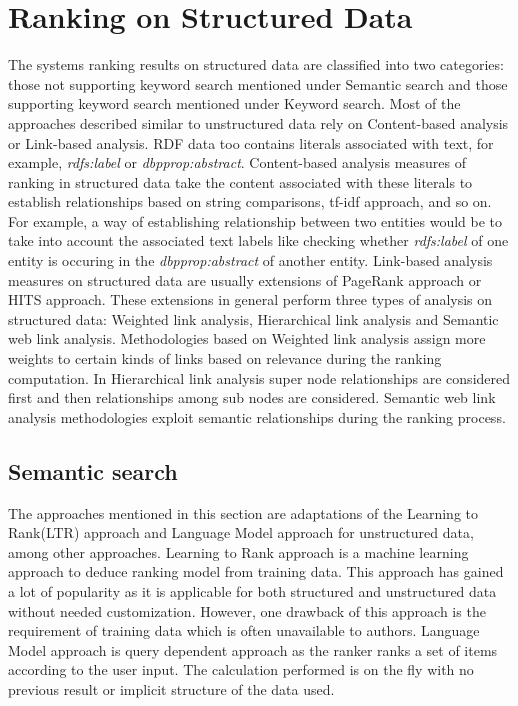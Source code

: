 \documentclass{article}
\begin{document}
    \section{Ranking on Structured Data}
    The systems ranking results on structured data are classified into two categories: those not supporting keyword search mentioned under Semantic search and those supporting keyword search mentioned under Keyword search. Most of the approaches described similar to unstructured data rely on Content-based analysis or Link-based analysis. RDF data too contains literals associated with text, for example, \emph{rdfs:label} or \emph{dbpprop:abstract}. Content-based analysis measures of ranking in structured data take the content associated with these literals to establish relationships based on string comparisons, tf-idf approach, and so on. For example, a way of establishing relationship between two entities would be to take into account the associated text labels like checking whether \emph{rdfs:label} of one entity is occuring in the \emph{dbpprop:abstract} of another entity. Link-based analysis measures on structured data are usually extensions of PageRank approach\cite{brin98} or HITS approach\cite{kleinberg98}. These extensions in general perform three types of analysis on structured data: Weighted link analysis, Hierarchical link analysis and Semantic web link analysis. Methodologies based on Weighted link analysis assign more weights to certain kinds of links based on relevance during the ranking computation. In Hierarchical link analysis super node relationships are considered first and then relationships among sub nodes are considered. Semantic web link analysis methodologies exploit semantic relationships during the ranking process.

    \subsection{Semantic search}
    The approaches mentioned in this section are adaptations of the Learning to Rank(LTR) approach and Language Model approach for unstructured data, among other approaches. Learning to Rank approach is a machine learning approach to deduce ranking model from training data. This approach has gained a lot of popularity as it is applicable for both structured and unstructured data without needed customization. However, one drawback of this approach is the requirement of training data which is often unavailable to authors. Language Model approach is query dependent approach as the ranker ranks a set of items according to the user input. The calculation performed is on the fly with no previous result or implicit structure of the data used.
\end{document}
